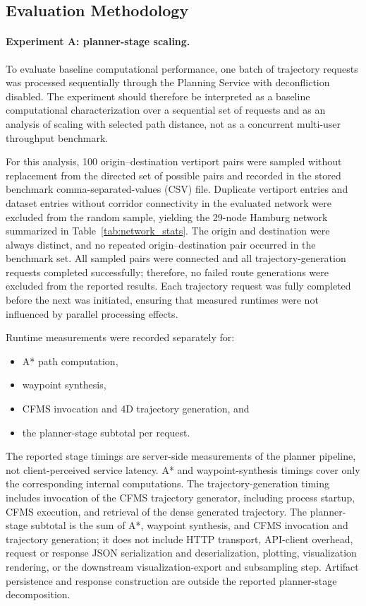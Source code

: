 \subsection{Evaluation Methodology}
\label{sec:evaluation_methodology}

\paragraph{Experiment A: planner-stage scaling.}
To evaluate baseline computational performance, one batch of trajectory requests was processed sequentially through the Planning Service with deconfliction disabled. The experiment should therefore be interpreted as a baseline computational characterization over a sequential set of requests and as an analysis of scaling with selected path distance, not as a concurrent multi-user throughput benchmark.

For this analysis, 100 origin--destination vertiport pairs were sampled without replacement from the directed set of possible pairs and recorded in the stored benchmark comma-separated-values (CSV) file. Duplicate vertiport entries and dataset entries without corridor connectivity in the evaluated network were excluded from the random sample, yielding the 29-node Hamburg network summarized in Table~\ref{tab:network_stats}. The origin and destination were always distinct, and no repeated origin--destination pair occurred in the benchmark set. All sampled pairs were connected and all trajectory-generation requests completed successfully; therefore, no failed route generations were excluded from the reported results. Each trajectory request was fully completed before the next was initiated, ensuring that measured runtimes were not influenced by parallel processing effects.

Runtime measurements were recorded separately for:
\begin{itemize}
    \item A* path computation,
    \item waypoint synthesis,
    \item CFMS invocation and 4D trajectory generation, and
    \item the planner-stage subtotal per request.
\end{itemize}

The reported stage timings are server-side measurements of the planner pipeline, not client-perceived service latency. A* and waypoint-synthesis timings cover only the corresponding internal computations. The trajectory-generation timing includes invocation of the CFMS trajectory generator, including process startup, CFMS execution, and retrieval of the dense generated trajectory. The planner-stage subtotal is the sum of A*, waypoint synthesis, and CFMS invocation and trajectory generation; it does not include HTTP transport, API-client overhead, request or response JSON serialization and deserialization, plotting, visualization rendering, or the downstream visualization-export and subsampling step. Artifact persistence and response construction are outside the reported planner-stage decomposition.

